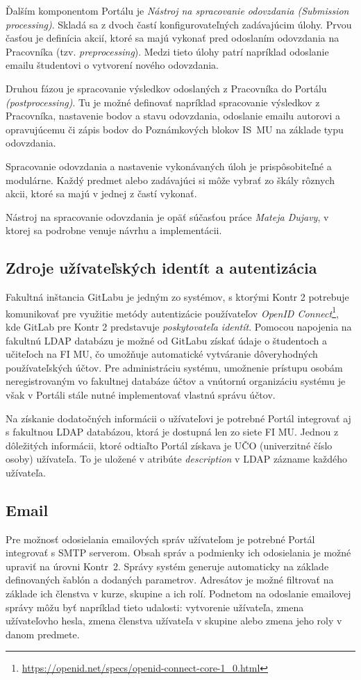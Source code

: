 \documentclass[
  digital, %
  oneside, %
  table,   %
  lof,     %
  lot,   %
]{fithesis3}
\begin{document}
Ďalším komponentom Portálu je \emph{Nástroj na spracovanie odovzdania (Submission processing)}. Skladá sa z dvoch častí konfigurovateľných zadávajúcim úlohy. Prvou časťou je definícia akcií, ktoré sa majú vykonať pred odoslaním odovzdania na Pracovníka (tzv. \emph{preprocessing}). Medzi tieto úlohy patrí napríklad odoslanie emailu študentovi o vytvorení nového odovzdania.

Druhou fázou je spracovanie výsledkov odoslaných z Pracovníka do Portálu \emph{(postprocessing)}. Tu je možné definovať napríklad spracovanie výsledkov z Pracovníka, nastavenie bodov a stavu odovzdania, odoslanie emailu autorovi a opravujúcemu či zápis bodov do Poznámkových blokov IS~MU na základe typu odovzdania. 

Spracovanie odovzdania a nastavenie vykonávaných úloh je prispôsobiteľné a modulárne. Každý predmet alebo zadávajúci si môže vybrať zo škály rôznych akcii, ktoré sa majú v jednej z častí vykonať.

Nástroj na spracovanie odovzdania je opäť súčasťou práce \emph{Mateja Dujavy}\cite{kontr-scheduler}, v ktorej sa podrobne venuje návrhu a implementácii.

\subsection{Zdroje užívateľských identít a autentizácia}

Fakultná inštancia GitLabu je jedným zo systémov, s ktorými Kontr 2 potrebuje komunikovať pre využitie metódy autentizácie používateľov \emph{OpenID Connect}\footnote{\url{https://openid.net/specs/openid-connect-core-1_0.html}}, kde GitLab pre Kontr 2 predstavuje \emph{poskytovateľa identít}. Pomocou napojenia na fakultnú LDAP databázu je možné od GitLabu získať údaje o študentoch a učiteľoch na FI MU, čo umožňuje automatické vytváranie dôveryhodných používateľských účtov. Pre administráciu systému, umožnenie prístupu osobám neregistrovaným vo fakultnej databáze účtov a vnútornú organizáciu systému je však v Portáli stále nutné implementovať vlastnú správu účtov. 

Na získanie dodatočných informácii o užívateľovi je potrebné Portál integrovať aj s fakultnou LDAP databázou, ktorá je dostupná len zo siete FI MU. Jednou z dôležitých informácii, ktoré odtiaľto Portál získava je UČO (univerzitné číslo osoby) užívateľa. To je uložené v atribúte \emph{description} v LDAP zázname každého užívateľa.

\subsection{Email}
Pre možnosť odosielania emailových správ užívateľom je potrebné Portál integrovať s SMTP serverom. Obsah správ a podmienky ich odosielania je možné upraviť na úrovni Kontr~2. Správy systém generuje automaticky na základe definovaných šablón a dodaných parametrov. Adresátov je možné filtrovať na základe ich členstva v kurze, skupine a ich rolí. Podnetom na odoslanie emailovej správy môžu byť napríklad tieto udalosti: vytvorenie užívateľa, zmena užívateľovho hesla, zmena členstva užívateľa v skupine alebo zmena jeho roly v danom predmete.
\end{document}

